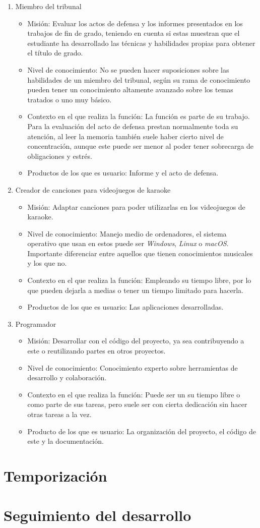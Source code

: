 \begin{enumerate}	
	\item{Miembro del tribunal}
	\begin{itemize}
		\item{Misión: Evaluar los actos de defensa y los informes presentados en los trabajos de fin de grado, teniendo en cuenta si estas muestran que el estudiante ha desarrollado las técnicas y habilidades propias para obtener el título de grado.}
		\item{Nivel de conocimiento: No se pueden hacer suposiciones sobre las habilidades de un miembro del tribunal, según su rama de conocimiento pueden tener un conocimiento altamente avanzado sobre los temas tratados o uno muy básico.}
		\item{Contexto en el que realiza la función: La función es parte de su trabajo. Para la evaluación del acto de defensa prestan normalmente toda su atención, al leer la memoria también suele haber cierto nivel de concentración, aunque este puede ser menor al poder tener sobrecarga de obligaciones y estrés.}
		\item{Productos de los que es usuario: Informe y el acto de defensa.}
	\end{itemize}
	
	\item{Creador de canciones para videojuegos de karaoke}
	\begin{itemize}
		\item{Misión: Adaptar canciones para poder utilizarlas en los videojuegos de karaoke.}
		\item{Nivel de conocimiento: Manejo medio de ordenadores, el sistema operativo que usan en estos puede ser \textit{Windows}, \textit{Linux} o \textit{macOS}. Importante diferenciar entre aquellos que tienen conocimientos musicales y los que no.}
		\item{Contexto en el que realiza la función: Empleando su tiempo libre, por lo que pueden dejarla a medias o tener un tiempo limitado para hacerla.}
		\item{Productos de los que es usuario: Las aplicaciones desarrolladas.}
	\end{itemize}
	
		\item{Programador}
	\begin{itemize}
		\item{Misión: Desarrollar con el código del proyecto, ya sea contribuyendo a este o reutilizando partes en otros proyectos.}
		\item{Nivel de conocimiento: Conocimiento experto sobre herramientas de desarrollo y colaboración.}
		\item{Contexto en el que realiza la función: Puede ser un su tiempo libre o como parte de sus tareas, pero suele ser con cierta dedicación sin hacer otras tareas a la vez.}
		\item{Producto de los que es usuario: La organización del proyecto, el código de este y la documentación.}
	\end{itemize}
\end{enumerate}




\section{Temporización}

\section{Seguimiento del desarrollo}
